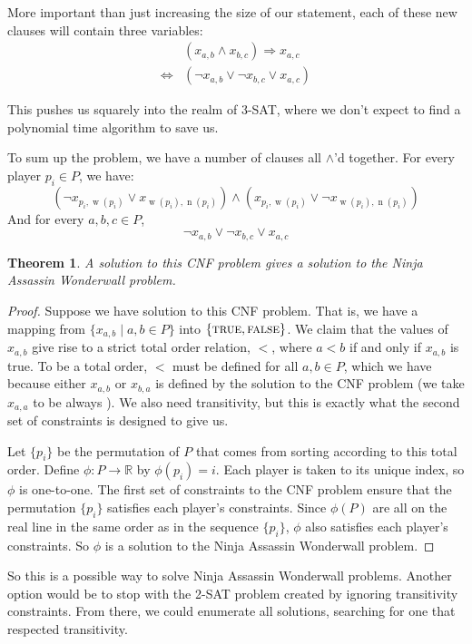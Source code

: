 \documentclass[12pt,x11names, rgb]{article}
\newtheorem*{thm}{Theorem}
\DeclareMathOperator{\w}{w}
\DeclareMathOperator{\n}{n}
\begin{document}
    More important than just increasing the size of our statement, each of these new clauses will contain three variables:
    \begin{align*}
        &(x_{a,b} \wedge x_{b,c}) \Rightarrow x_{a,c} \\
        \Leftrightarrow & (\lnot x_{a,b} \vee \lnot x_{b,c} \vee x_{a,c})
    \end{align*}

    This pushes us squarely into the realm of 3-SAT, where we don't expect to find a polynomial time algorithm to save us. 
    
    To sum up the problem, we have a number of clauses all $\wedge$'d together. For every player $p_i \in P$, we have:
\[
	(\lnot x_{p_i, \w(p_i)} \vee x_{\w(p_i), \n(p_i)}) \wedge (x_{p_i, \w(p_i)} \vee \lnot x_{\w(p_i), \n(p_i)})
\]
	And for every $a,b,c \in P$, 
\[
	\lnot x_{a,b} \vee \lnot x_{b,c} \vee x_{a,c}
\]
	\vspace{12pt}
	\begin{thm} A solution to this CNF problem gives a solution to the Ninja Assassin Wonderwall problem. 
	\end{thm}
    \begin{proof}
    Suppose we have solution to this CNF problem. That is, we have a mapping from $\{x_{a,b} \mid a,b \in P\}$ into $\{\textnormal{\scshape true}, \textnormal{\scshape false}\}$. We claim that the values of $x_{a,b}$ give rise to a strict total order relation, $<$, where $a<b$ if and only if $x_{a,b}$ is true. To be a total order, $<$ must be defined for all $a,b \in P$, which we have because either $x_{a,b}$ or $x_{b,a}$ is defined by the solution to the CNF problem (we take $x_{a,a}$ to be always ). We also need transitivity, but this is exactly what the second set of constraints is designed to give us.

    Let $\{p_i\}$ be the permutation of $P$ that comes from sorting according to this total order. Define $\phi: P \to \mathbb{R}$ by $\phi(p_i) = i$. Each player is taken to its unique index, so $\phi$ is one-to-one. The first set of constraints to the CNF problem ensure that the permutation $\{p_i\}$ satisfies each player's constraints. Since $\phi(P)$ are all on the real line in the same order as in the sequence $\{p_i\}$, $\phi$ also satisfies each player's constraints. So $\phi$ is a solution to the Ninja Assassin Wonderwall problem.
    
    \end{proof}

    So this is a possible way to solve Ninja Assassin Wonderwall problems. Another option would be to stop with the 2-SAT problem created by ignoring transitivity constraints. From there, we could enumerate all solutions, searching for one that respected transitivity. %
\end{document}
